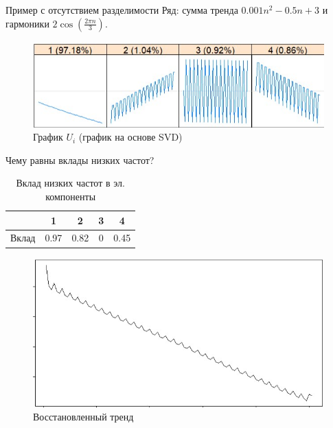 \documentclass[ucs, notheorems]{beamer}
\begin{document}
\begin{frame}{Пример с отсутствием разделимости}
    Ряд: сумма тренда $0.001n^2 - 0.5n + 3$ и гармоники $2 \cos(\frac{2 \pi n} {3})$.\\
    \pause
    \begin{figure}
      \begin{minipage}[c]{0.5\textwidth}
        \includegraphics[scale = 0.4]{ssa_example4.jpg}
      \end{minipage}\hfill
      \begin{minipage}[l]{0.5\textwidth}
        \caption{
           \footnotesize График $U_i$ (график на основе SVD)
        } \label{fig:03-03}
      \end{minipage}
    \end{figure}
    Чему равны вклады низких частот?\\
    \pause
    \begin{table}[h]
            \caption{\footnotesize Вклад низких частот в эл. компоненты}
            \footnotesize
            \begin{tabular}{|l | c| c| c| c|}
            \hline
             & 1 & 2 & 3 & 4\\
             \hline
             Вклад & 0.97 & 0.82 & 0 & 0.45 \\
            \hline
            \end{tabular}

        \end{table}

    \begin{figure}
      \begin{minipage}[l]{0.5\textwidth}
        \includegraphics[scale = 0.33]{ssa_example5.jpg}
      \end{minipage}\hfill
      \begin{minipage}[l]{0.5\textwidth}
        \caption{
           \footnotesize Восстановленный тренд
        } \label{fig:03-03}
      \end{minipage}
    \end{figure}


\end{frame}
\end{document}
